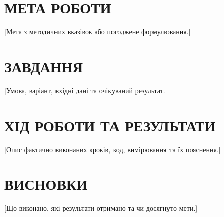 \documentclass[14pt,a4paper]{extarticle}
\begin{document}
\section*{МЕТА РОБОТИ}
[Мета з методичних вказівок або погоджене формулювання.]

\section{ЗАВДАННЯ}
[Умова, варіант, вхідні дані та очікуваний результат.]

\section{ХІД РОБОТИ ТА РЕЗУЛЬТАТИ}
[Опис фактично виконаних кроків, код, вимірювання та їх пояснення.]

%
%

\section*{ВИСНОВКИ}
[Що виконано, які результати отримано та чи досягнуто мети.]

\end{document}
